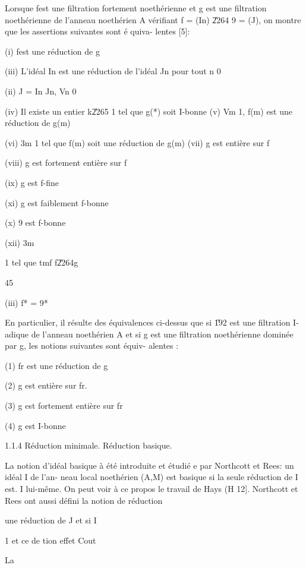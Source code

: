 \documentclass[11pt, twoside]{article}
\begin{document}
Lorsque fest une filtration fortement noeth\'{e}rienne et g est une
filtration noeth\'{e}rienne de l'anneau noeth\'{e}rien A v\'{e}rifiant f =
(In) \U{2264} 9 = (J), on montre que les assertions suivantes sont \'{e}%
quiva- lentes [5]:

(i) fest une r\'{e}duction de g

(iii) L'id\'{e}al In est une r\'{e}duction de l'id\'{e}al Jn pour tout n 
\TEXTsymbol{>}\TEXTsymbol{>} 0

(ii) J = In Jn, Vn \TEXTsymbol{>}\TEXTsymbol{>} 0

(iv) Il existe un entier k\U{2265} 1 tel que g(*) soit I-bonne (v) Vm 
\TEXTsymbol{>} 1, f(m) est une r\'{e}duction de g(m)

(vi) 3m \TEXTsymbol{>} 1 tel que f(m) soit une r\'{e}duction de g(m) (vii) g
est enti\`{e}re sur f

(viii) g est fortement enti\`{e}re sur f

(ix) g est f-fine

(xi) g est faiblement f-bonne

(x) 9 est f-bonne

(xii) 3m

1 tel que tmf f\U{2264}g

45

(iii) f* = 9*

En particulier, il r\'{e}sulte des \'{e}quivalences ci-dessus que si \U{192}
est une filtration I-adique de l'anneau noeth\'{e}rien A et si g est une
filtration noeth\'{e}rienne domin\'{e}e par g, les notions suivantes sont 
\'{e}quiv- alentes :

(1) fr est une r\'{e}duction de g

(2) g est enti\`{e}re sur fr.

(3) g est fortement enti\`{e}re sur fr

(4) g est I-bonne

1.1.4 R\'{e}duction minimale. R\'{e}duction basique.

La notion d'id\'{e}al basique \`{a} \'{e}t\'{e} introduite et \'{e}tudi\'{e}%
e par Northcott et Rees: un id\'{e}al I de l'an- neau local noeth\'{e}rien
(A,M) est basique si la seule r\'{e}duction de I est. I lui-m\^{e}me. On
peut voir \`{a} ce propos le travail de Hays (H 12]. Northcott et Rees ont
aussi d\'{e}fini la notion de r\'{e}duction

une r\'{e}duction de J et si I

1 et ce de tion effet Cout

La
\end{document}
